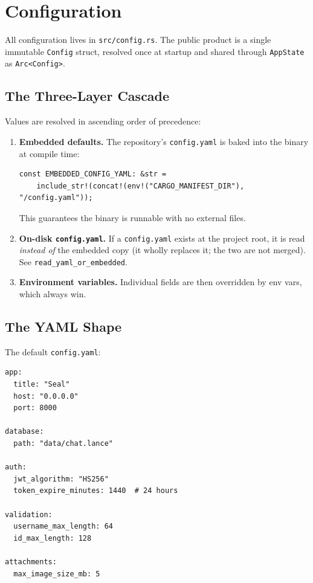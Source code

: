 \chapter{Configuration}
\label{chap:config}

All configuration lives in \verb|src/config.rs|. The public product is a single
immutable \verb|Config| struct, resolved once at startup and shared through
\verb|AppState| as \verb|Arc<Config>|.

\section{The Three-Layer Cascade}

Values are resolved in ascending order of precedence:

\begin{enumerate}
  \item \textbf{Embedded defaults.} The repository's \verb|config.yaml| is baked
        into the binary at compile time:
\begin{lstlisting}
const EMBEDDED_CONFIG_YAML: &str =
    include_str!(concat!(env!("CARGO_MANIFEST_DIR"), "/config.yaml"));
\end{lstlisting}
        This guarantees the binary is runnable with no external files.
  \item \textbf{On-disk \texttt{config.yaml}.} If a \verb|config.yaml| exists at
        the project root, it is read \emph{instead of} the embedded copy (it
        wholly replaces it; the two are not merged). See
        \verb|read_yaml_or_embedded|.
  \item \textbf{Environment variables.} Individual fields are then overridden by
        env vars, which always win.
\end{enumerate}

\section{The YAML Shape}

The default \verb|config.yaml|:

\begin{lstlisting}
app:
  title: "Seal"
  host: "0.0.0.0"
  port: 8000

database:
  path: "data/chat.lance"

auth:
  jwt_algorithm: "HS256"
  token_expire_minutes: 1440  # 24 hours

validation:
  username_max_length: 64
  id_max_length: 128

attachments:
  max_image_size_mb: 5
\end{lstlisting}

